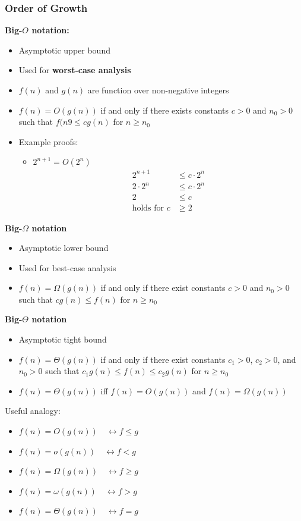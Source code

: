 \subsubsection{Order of Growth}
\textbf{Big-$O$ notation:}
\begin{itemize}
    \item Asymptotic upper bound
    \item Used for \textbf{worst-case analysis}
    \item $f(n)$ and $g(n)$ are function over non-negative integers
    \item $f(n)= O(g(n))$ if and only if there exists constants $c>0$ and $n_0>0$ such that $f(n9 \leq cg(n)$ for $n\geq n_0$
    \item Example proofs:
    \begin{itemize}
        \item $2^{n+1} = O(2^n)$
        \begin{align*}
            2^{n+1} &\leq c\cdot 2^n \\
            2\cdot 2^n &\leq c\cdot 2^n\\
            2&\leq c\\
            \text{holds for } c&\geq 2
        \end{align*}
    \end{itemize}
\end{itemize}
\textbf{Big-$\Omega$ notation}
\begin{itemize}
    \item Asymptotic lower bound
    \item Used for best-case analysis
    \item $f(n) =\Omega(g(n))$ if and only if there exist constants $c>0$ and $n_0>0$ such that $cg(n) \leq f(n) $ for $n\geq n_0$
\end{itemize}

\textbf{Big-$\Theta$ notation}
\begin{itemize}
    \item Asymptotic tight bound
    \item $f(n)= \Theta(g(n))$ if and only if there exist constants $c_1 >0$, $c_2>0$, and $n_0>0$ such that $c_1g(n)\leq f(n) \leq c_2g(n)$ for $n \geq n_0$
    \item $f(n) = \Theta(g(n))$ iff $f(n) = O(g(n))$ and $f(n) = \Omega(g(n))$
\end{itemize}

Useful analogy:
\begin{itemize}
    \item $f(n)=O(g(n)) \quad \leftrightarrow f \leq g $
    \item $f(n)=o(g(n)) \quad \leftrightarrow f < g$
    \item $f(n)=\Omega(g(n)) \quad \leftrightarrow f \geq g$
    \item $f(n)=\omega (g(n)) \quad \leftrightarrow f>g$
    \item $f(n) = \Theta(g(n)) \quad \leftrightarrow f=g$
\end{itemize}


